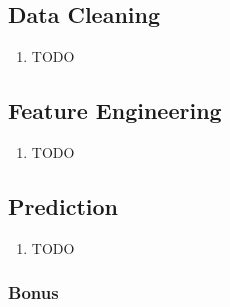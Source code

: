 \subsection{Data Cleaning}

\begin{enumerate}
    \item TODO
\end{enumerate}

\subsection{Feature Engineering}

\begin{enumerate}
    \item TODO
\end{enumerate}

\subsection{Prediction}

\begin{enumerate}
    \item TODO
\end{enumerate}

\subsubsection{Bonus}


